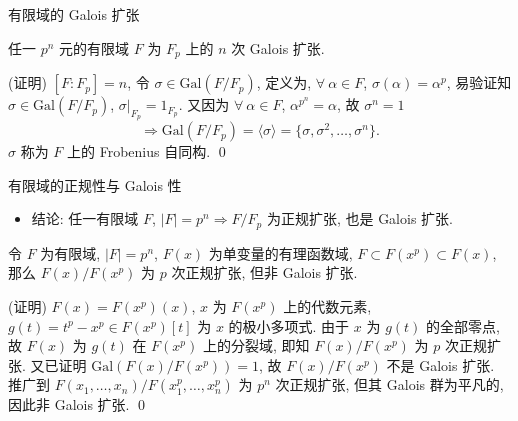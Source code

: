 
\begin{frame}{有限域的 Galois 扩张}

\begin{prop}
任一 $p^n$ 元的有限域 $F$ 为 $F_p$ 上的 $n$ 次 Galois 扩张.
\end{prop}

\startproof[bg=yellow, fg=red](证明)
$[F:F_p] = n$, 令 $\sigma \in \mathrm{Gal}(F/F_p)$,
定义为, $\forall\ \alpha \in F$, $\sigma(\alpha) = \alpha^p$,
易验证知 $\sigma \in \mathrm{Gal}(F/F_p)$, $\sigma|_{F_p} = 1_{F_p}$.
又因为 $\forall\ \alpha \in F$, $\alpha^{p^n} = \alpha$, 故 $\sigma^n = 1$
\[
\Longrightarrow \mathrm{Gal}(F/F_p) = \langle \sigma \rangle
= \{ \sigma, \sigma^2, \dots, \sigma^n \}.
\]
$\sigma$ 称为 $F$ 上的 Frobenius 自同构.
\qed

\end{frame}


\begin{frame}{有限域的正规性与 Galois 性}

\begin{itemize}
\item 结论: 任一有限域 $F$, $|F| = p^n \Longrightarrow F/F_p$ 为正规扩张,
  也是 Galois 扩张.
\end{itemize}

\pause

\begin{eg}
令 $F$ 为有限域, $|F| = p^n$, $F(x)$ 为单变量的有理函数域,
$F \subset F(x^p) \subset F(x)$, 那么 $F(x)/F(x^p)$ 为 $p$ 次正规扩张,
但非 Galois 扩张.
\end{eg}

\startproof[bg=yellow, fg=red](证明)
$F(x) = F(x^p)(x)$, $x$ 为 $F(x^p)$ 上的代数元素,
$g(t) = t^p - x^p \in F(x^p)[t]$ 为 $x$ 的极小多项式.
由于 $x$ 为 $g(t)$ 的全部零点, 故 $F(x)$ 为 $g(t)$ 在 $F(x^p)$ 上的分裂域,
即知 $F(x)/F(x^p)$ 为 $p$ 次正规扩张.
又已证明 $\mathrm{Gal}(F(x)/F(x^p)) = 1$,
故 $F(x)/F(x^p)$ 不是 Galois 扩张.
推广到 $F(x_1, \dots, x_n)/F(x_1^p, \dots, x_n^p)$ 为 $p^n$ 次正规扩张,
但其 Galois 群为平凡的, 因此非 Galois 扩张.
\qed

\end{frame}



